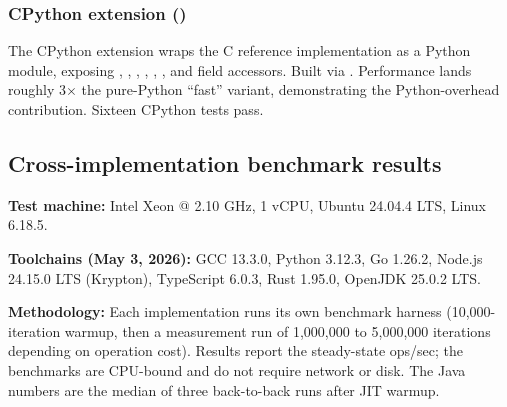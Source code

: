 \subsubsection{CPython extension ()}

The CPython extension wraps the C reference implementation as a Python module, exposing , , , , , , and field accessors. Built via . Performance lands roughly 3$\times$ the pure-Python ``fast'' variant, demonstrating the Python-overhead contribution. Sixteen CPython tests pass.

\subsection{Cross-implementation benchmark results}

\textbf{Test machine:} Intel Xeon @ 2.10 GHz, 1 vCPU, Ubuntu 24.04.4 LTS, Linux 6.18.5.

\textbf{Toolchains (May 3, 2026):} GCC 13.3.0, Python 3.12.3, Go 1.26.2, Node.js 24.15.0 LTS (Krypton), TypeScript 6.0.3, Rust 1.95.0, OpenJDK 25.0.2 LTS.

\textbf{Methodology:} Each implementation runs its own benchmark harness (10{,}000-iteration warmup, then a measurement run of 1{,}000{,}000 to 5{,}000{,}000 iterations depending on operation cost). Results report the steady-state ops/sec; the benchmarks are CPU-bound and do not require network or disk. The Java numbers are the median of three back-to-back runs after JIT warmup.

